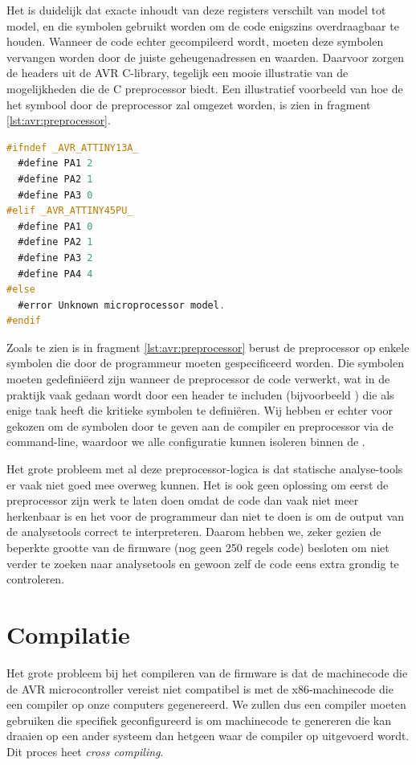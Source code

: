 Het is duidelijk dat exacte inhoudt van deze registers verschilt van model tot model, en die symbolen gebruikt worden om de code enigszins overdraagbaar te houden. Wanneer de code echter gecompileerd wordt, moeten deze symbolen vervangen worden door de juiste geheugenadressen en waarden. Daarvoor zorgen de headers uit de AVR C-library, tegelijk een mooie illustratie van de mogelijkheden die de C preprocessor biedt. Een illustratief voorbeeld van hoe de het  symbool door de preprocessor zal omgezet worden, is zien in fragment \ref{lst:avr:preprocessor}.

\begin{lstlisting}[language=C, float, caption=Omzetten van AVR symbolen via preprocessor-logica., label=lst:avr:preprocessor]
#ifndef _AVR_ATTINY13A_
  #define PA1 2
  #define PA2 1
  #define PA3 0
#elif _AVR_ATTINY45PU_
  #define PA1 0
  #define PA2 1
  #define PA3 2
  #define PA4 4
#else
  #error Unknown microprocessor model.
#endif
\end{lstlisting}

Zoals te zien is in fragment \ref{lst:avr:preprocessor} berust de preprocessor op enkele symbolen die door de programmeur moeten gespecificeerd worden. Die symbolen moeten gedefiniëerd zijn wanneer de preprocessor de code verwerkt, wat in de praktijk vaak gedaan wordt door een header te includen (bijvoorbeeld ) die als enige taak heeft die kritieke symbolen te definiëren. Wij hebben er echter voor gekozen om de symbolen door te geven aan de compiler en preprocessor via de command-line, waardoor we alle configuratie kunnen isoleren binnen de .

Het grote probleem met al deze preprocessor-logica is dat statische analyse-tools er vaak niet goed mee overweg kunnen. Het is ook geen oplossing om eerst de preprocessor zijn werk te laten doen omdat de code dan vaak niet meer herkenbaar is en het voor de programmeur dan niet te doen is om de output van de analysetools correct te interpreteren. Daarom hebben we, zeker gezien de beperkte grootte van de firmware (nog geen 250 regels code) besloten om niet verder te zoeken naar analysetools en gewoon zelf de code eens extra grondig te controleren.

\section{Compilatie}
\label{inputmodule:firmware:compilatie}

Het grote probleem bij het compileren van de firmware is dat de machinecode die de AVR microcontroller vereist niet compatibel is met de x86-machinecode die een compiler op onze computers gegenereerd. We zullen dus een compiler moeten gebruiken die specifiek geconfigureerd is om machinecode te genereren die kan draaien op een ander systeem dan hetgeen waar de compiler op uitgevoerd wordt. Dit proces heet \emph{cross compiling}.

